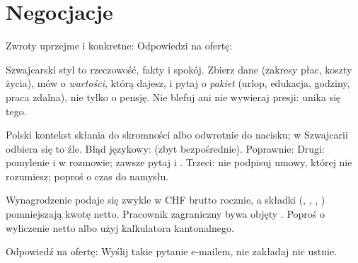 \section{Negocjacje}
Zwroty uprzejme i konkretne:  
  
Odpowiedzi na ofertę:  

\begin{zasada}
Szwajcarski styl to rzeczowość, fakty i spokój. Zbierz dane (zakresy płac, koszty życia), mów o \emph{wartości}, którą dajesz, i pytaj o
\emph{pakiet} (urlop, edukacja, godziny, praca zdalna), nie tylko o pensję. Nie blefuj ani nie wywieraj presji: unika się tego.
\end{zasada}

\begin{falle}
Polski kontekst skłania do skromności albo odwrotnie do nacisku; w Szwajcarii odbiera się to źle. Błąd językowy:  (zbyt
bezpośrednie). Poprawnie:  Drugi: pomylenie  i  w rozmowie; zawsze
pytaj  i . Trzeci: nie podpisuj umowy, której nie rozumiesz; poproś o czas do namysłu.
\end{falle}

\begin{szwajcaria}
Wynagrodzenie podaje się zwykle w CHF brutto rocznie, a składki (, , , ) pomniejszają kwotę netto. Pracownik zagraniczny
bywa objęty  . Poproś o wyliczenie netto albo użyj kalkulatora kantonalnego.
\end{szwajcaria}

\begin{praca}
Odpowiedź na ofertę:  Wyślij takie pytanie e-mailem, nie zakładaj nic ustnie.
\end{praca}

